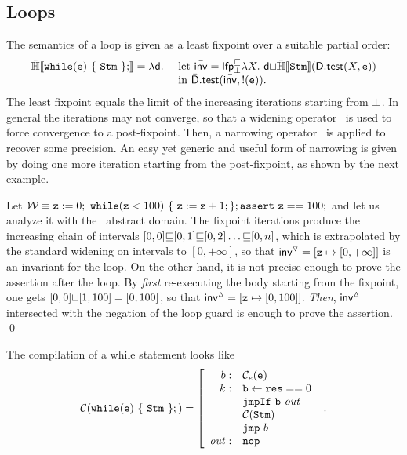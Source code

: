 \documentclass{llncs}
\begin{document}
\subsection{Loops}
The semantics of a loop is given as a least fixpoint over a suitable partial order:
\begin{equation*}
  \begin{array}{r l}
    \HLSem{\While(\code{e})\ \{\ \Stm\ \};} = \lambda \ael{d}.\ & \mathrm{let}\ \ael{inv} = \mathsf{lfp}_{\abot}^{\aless} \lambda X.\ \ael{d} \acup \HLSem{\Stm}(\adom{D}.\atest(X, \code{e})) \\
& \mathrm{in}\ \adom{D}.\atest(\ael{inv}, \code{!(e)}).
  \end{array}
\end{equation*}
The least fixpoint equals the limit of the increasing iterations starting from ${\bot}$.
In general the iterations may not converge, so that a widening operator~\cite{CousotCousot77} is used to force convergence to a post-fixpoint.
Then, a narrowing operator~\cite{CousotCousot77} is applied to recover some precision.
An easy yet generic and useful form of narrowing is given by doing one more iteration starting from the post-fixpoint, as shown by the next example.

\begin{example}
\label{ex:narrowing}
Let $\mathcal{W} \equiv \mathtt{z} := 0;\ \mathtt{while}(\mathtt{z} < 100 )\ \{\ \mathtt{z} := \mathtt{z} + 1; \}; \mathtt{assert}~ \mathtt{z} == 100;$ and let us analyze it with the \Intervals\ abstract domain.
The fixpoint iterations produce the increasing chain of intervals $[0,0] {\ensuremath{\sqsubseteq}}\allowbreak [0,1] {\ensuremath{\sqsubseteq}}\allowbreak [0, 2]\allowbreak \dots {\ensuremath{\sqsubseteq}} [0, n]$, which is extrapolated by the standard widening on intervals to $[0, +\infty]$, so that $\mathsf{inv}^{\triangledown} = [\mathtt{z} \mapsto [0,  +\infty]] $ is an invariant for the loop.
On the other hand, it is not precise enough to prove the assertion after the loop.
By \emph{first} re-executing the body starting from the fixpoint, one gets $[0,0] {\sqcup} [1, 100] = [0, 100]$, so that  $\mathsf{inv}^{\vartriangle} = [\mathtt{z} \mapsto [0,  100]]$.
\emph{Then},  $\mathsf{inv}^{\vartriangle}$ intersected with the negation of the loop guard is enough to prove the assertion. \qed
\end{example}

The compilation of a while statement looks like
\begin{equation}
  \mathcal{C}(\mathtt{while}(\mathtt{e})\ \{\ \mathtt{Stm}\ \}; ) = 
  \left [ 
    \begin{array}{r l}
      b: & \mathcal{C}_{e}(\mathtt{e}) \\
      k :& \mathtt{b} \leftarrow \mathtt{res} == 0 \\
      & \mathtt{jmpIf}\ \mathtt{b}\  \mathit{out} \\
      & \mathcal{C}(\mathtt{Stm}) \\
      & \mathtt{jmp}\ b \\
      \mathit{out}: &\mathtt{nop}
    \end{array}
  \right. \ .
\label{comp:While}
\end{equation}
\end{document}
